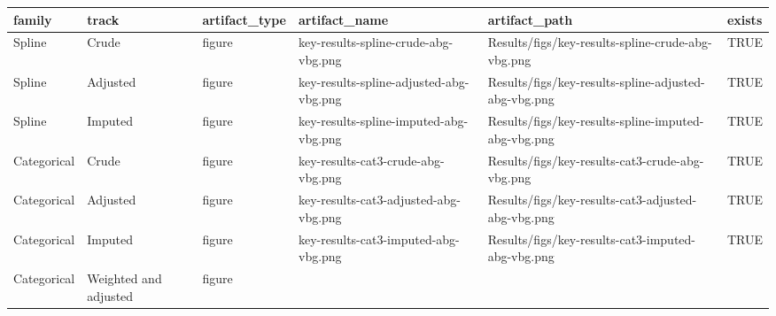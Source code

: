 \documentclass[
  11pt,
  letterpaper,
  DIV=11,
  numbers=noendperiod]{scrartcl}
\begin{document}
\begin{longtable}[]{@{}
  >{\raggedright\arraybackslash}p{}
  >{\raggedright\arraybackslash}p{}
  >{\raggedright\arraybackslash}p{}
  >{\raggedright\arraybackslash}p{}
  >{\raggedright\arraybackslash}p{}
  >{\raggedright\arraybackslash}p{}@{}}
\toprule\noalign{}
\begin{minipage}[b]{\linewidth}\raggedright
family
\end{minipage} & \begin{minipage}[b]{\linewidth}\raggedright
track
\end{minipage} & \begin{minipage}[b]{\linewidth}\raggedright
artifact\_type
\end{minipage} & \begin{minipage}[b]{\linewidth}\raggedright
artifact\_name
\end{minipage} & \begin{minipage}[b]{\linewidth}\raggedright
artifact\_path
\end{minipage} & \begin{minipage}[b]{\linewidth}\raggedright
exists
\end{minipage} \\
\midrule\noalign{}
\endhead
\bottomrule\noalign{}
\endlastfoot
Spline & Crude & figure & key-results-spline-crude-abg-vbg.png &
Results/figs/key-results-spline-crude-abg-vbg.png & TRUE \\
Spline & Adjusted & figure & key-results-spline-adjusted-abg-vbg.png &
Results/figs/key-results-spline-adjusted-abg-vbg.png & TRUE \\
Spline & Imputed & figure & key-results-spline-imputed-abg-vbg.png &
Results/figs/key-results-spline-imputed-abg-vbg.png & TRUE \\
Categorical & Crude & figure & key-results-cat3-crude-abg-vbg.png &
Results/figs/key-results-cat3-crude-abg-vbg.png & TRUE \\
Categorical & Adjusted & figure & key-results-cat3-adjusted-abg-vbg.png
& Results/figs/key-results-cat3-adjusted-abg-vbg.png & TRUE \\
Categorical & Imputed & figure & key-results-cat3-imputed-abg-vbg.png &
Results/figs/key-results-cat3-imputed-abg-vbg.png & TRUE \\
Categorical & Weighted and adjusted & figure &

\end{longtable}
\end{document}

